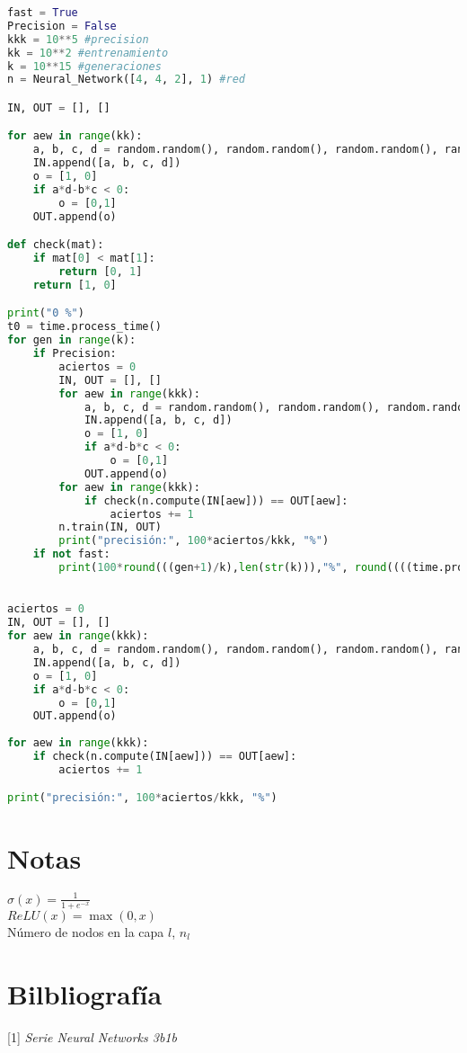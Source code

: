 \documentclass{article}
\begin{document}
\begin{lstlisting}[language=Python]
fast = True
Precision = False
kkk = 10**5 #precision
kk = 10**2 #entrenamiento
k = 10**15 #generaciones
n = Neural_Network([4, 4, 2], 1) #red

IN, OUT = [], []

for aew in range(kk):
    a, b, c, d = random.random(), random.random(), random.random(), random.random()
    IN.append([a, b, c, d])
    o = [1, 0]
    if a*d-b*c < 0:
        o = [0,1]
    OUT.append(o)

def check(mat):
    if mat[0] < mat[1]:
        return [0, 1]
    return [1, 0]

print("0 %")
t0 = time.process_time()
for gen in range(k):
    if Precision:
        aciertos = 0
        IN, OUT = [], []
        for aew in range(kkk):
            a, b, c, d = random.random(), random.random(), random.random(), random.random()
            IN.append([a, b, c, d])
            o = [1, 0]
            if a*d-b*c < 0:
                o = [0,1]
            OUT.append(o)
        for aew in range(kkk):
            if check(n.compute(IN[aew])) == OUT[aew]:
                aciertos += 1
        n.train(IN, OUT)
        print("precisión:", 100*aciertos/kkk, "%")
    if not fast:
        print(100*round(((gen+1)/k),len(str(k))),"%", round((((time.process_time()-t0))*(k-gen-1)/(gen+1))/60,2), "min faltan", (time.process_time()-t0)/60, "min transcurridos")
    

aciertos = 0
IN, OUT = [], []
for aew in range(kkk):
    a, b, c, d = random.random(), random.random(), random.random(), random.random()
    IN.append([a, b, c, d])
    o = [1, 0]
    if a*d-b*c < 0:
        o = [0,1]
    OUT.append(o)
    
for aew in range(kkk):
    if check(n.compute(IN[aew])) == OUT[aew]:
        aciertos += 1

print("precisión:", 100*aciertos/kkk, "%")

\end{lstlisting}
\section{Notas}
$\sigma(x) = \frac{1}{1+e^{-x}}$\\
$ReLU(x) = \max(0,x)$\\
Número de nodos en la capa $l$, $n_{l}$
\section{Bilbliografía}
[1] \textit{Serie Neural Networks 3b1b}
\end{document}
